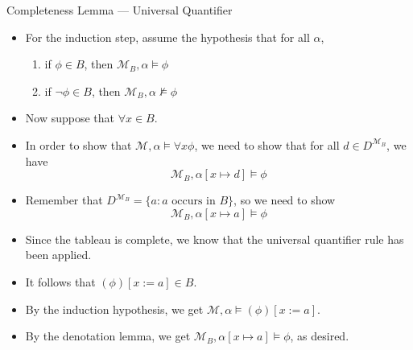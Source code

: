 \documentclass[../slides.tex]{subfiles}
\begin{document}
\begin{frame}{Completeness Lemma --- Universal Quantifier}

  \begin{itemize}
  \item For the induction step, assume the hypothesis that for all
    $\alpha$,
     \begin{enumerate}[1.]

                      \item if $\phi\in B$, then
                        $\mathcal{M}_B,\alpha\vDash\phi$

                        \item if $\neg\phi\in B$, then
                          $\mathcal{M}_B,\alpha\nvDash\phi$ 
                      
                        \end{enumerate}

                      \item Now suppose that $\forall x\in B$.

                        \item In order to show that
                          $\mathcal{M},\alpha\vDash\forall x\phi$, we
                          need to show that for all $d\in
                          D^{\mathcal{M}_B}$, we
                          have \[\mathcal{M}_B,\alpha[x\mapsto
                            d]\vDash \phi\]
                          \item Remember that $D^{\mathcal{M}_B}=\{a:
                            a\text{ occurs in }
                            B\}$, so we need to show \[\mathcal{M}_B,\alpha[x\mapsto
                            a]\vDash \phi\]

                              \item Since the tableau is complete, we
                                know that the universal quantifier
                                rule has been applied.

                                \item It follows that $(\phi)[x:=a]\in
                                  B$.

                                  \item By the induction hypothesis,
                                    we get $\mathcal{M},\alpha\vDash
                                    (\phi)[x:=a]$.

                                    \item By the denotation lemma, we
                                      get $\mathcal{M}_B,\alpha[x\mapsto
                            a]\vDash \phi$, as desired.
                        
  \end{itemize}
  
\end{frame}
\end{document}
